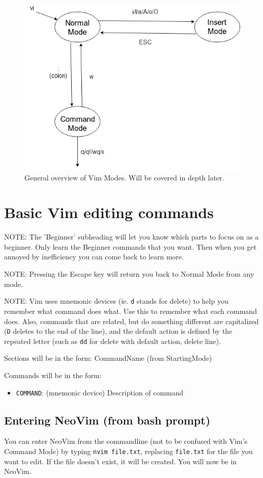 \documentclass[11pt]{article}
\begin{document}
\begin{figure}[htbp]
\centering
\includegraphics[width=.9\linewidth]{./modes.jpg}
\caption{\label{fig:orgbacf7f4}
General overview of Vim Modes. Will be covered in depth later.}
\end{figure}
\section{Basic Vim editing commands}
\label{sec:org834890a}
NOTE: The 'Beginner' subheading will let you know which parts to focus on as a
beginner. Only learn the Beginner commands that you want. Then when you get
annoyed by inefficiency you can come back to learn more.

NOTE: Pressing the Escape key will return you back to Normal Mode from any mode.

NOTE: Vim uses mnemonic devices (ie. \texttt{d} stands for delete) to help you remember
what command does what. Use this to remember what each command does. Also,
commands that are related, but do something different are capitalized (\texttt{D}
deletes to the end of the line), and the default action is defined by the
repeated letter (such as \texttt{dd} for delete with default action, delete line).

Sections will be in the form: CommandName (from StartingMode)

Commands will be in the form:
\begin{itemize}
\item \texttt{COMMAND}: (mnemonic device) Description of command
\end{itemize}
\subsection{Entering NeoVim (from bash prompt)}
\label{sec:org844ced7}
You can enter NeoVim from the commandline (not to be confused with Vim's Command
Mode) by typing \texttt{nvim file.txt}, replacing \texttt{file.txt} for the file you want to
edit. If the file doesn't exist, it will be created. You will now be in NeoVim.
\end{document}
